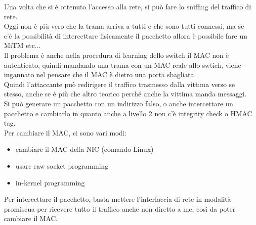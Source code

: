 \documentclass[12pt, oneside]{extbook} %
\begin{document}
Una volta che si è ottenuto l'accesso alla rete, si può fare lo sniffing del traffico di rete.
\\Oggi non è più vero che la trama arriva a tutti e che sono tutti connessi, ma se c'è la possibilità di intercettare fisicamente il pacchetto allora è possibile fare un MiTM etc...
\\Il problema è anche nella procedura di learning dello switch il MAC non è autenticato, quindi mandando una trama con un MAC reale allo swtich, viene ingannato nel pensare che il MAC è dietro una porta sbagliata.
\\Quindi l'attaccante può redirigere il traffico trasmesso dalla vittima verso se stesso, anche se è più che altro teorico perché anche la vittima manda messaggi.
\\Si può generare un pacchetto con un indirizzo falso, o anche intercettare un pacchetto e cambiarlo in quanto anche a livello 2 non c'è integrity check o HMAC tag.
\\Per cambiare il MAC, ci sono vari modi:
\begin{itemize}
    \item cambiare il MAC della NIC (comando Linux)
    \item usare raw socket programming
    \item in-kernel programming
\end{itemize}
Per intercettare il pacchetto, basta mettere l'interfaccia di rete in modalità promiscua per ricevere tutto il traffico anche non diretto a me, così da poter cambiare il MAC.
\end{document}
